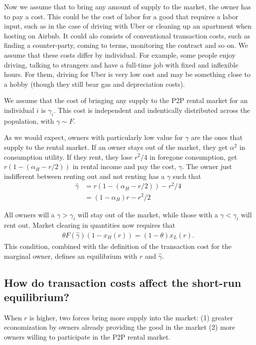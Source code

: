 
Now we assume that to bring any amount of supply to the market, the owner has to pay a cost.
This could be the cost of labor for a good that requires a labor input, such as in the case of driving with Uber or cleaning up an apartment when hosting on Airbnb.
It could alo consists of conventional transaction costs, such as finding a counter-party, coming to terms, monitoring the contract and so on. 
We assume that these costs differ by individual.
For example, some people enjoy driving, talking to strangers and have a full-time job with fixed and inflexible hours.
For them, driving for Uber is very low cost and may be something close to a hobby (though they still bear gas and depreciation costs).

We assume that the cost of bringing any supply to the P2P rental market for an individual $i$ is $\gamma_i$.
This cost is independent and indentically distributed across the population, with $\gamma \sim F$.

As we would expect, owners with particularly low value for $\gamma$ are the ones that supply to the rental market. 
If an owner stays out of the market, they get $\alpha^2$ in consumption utility.
If they rent, they lose $r^2/4$ in foregone consumption, get $r (1 - (\alpha_H - r/2))$ in rental income and pay the cost, $\gamma$.
The owner just indifferent between renting out and not renting has a $\hat{\gamma}$ such that
\begin{align} \label{eq:indiff}
  \hat{\gamma} & = r (1 - (\alpha_H - r/2)) - r^2/4 \nonumber \\
               & =  (1-\alpha_H)r - r^2/2 
\end{align}

All owners will a $\gamma > \gamma_i$ will stay out of the market, while those with a $\gamma < \gamma_i$ will rent out.
Market clearing in quantities now requires that
\begin{align}
  \theta F(\hat{\gamma})(1 - x_H(r)) = (1-\theta)x_L(r). 
\end{align} 
This condition, combined with the definition of the transaction cost for the marginal owner, defines an equilibrium with $r$ and $\hat{\gamma}$.

\subsection{How do transaction costs affect the short-run equilibrium?}
When $r$ is higher, two forces bring more supply into the market:
(1) greater economization by owners already providing the good in the market
(2) more owners willing to participate in the P2P rental market.


